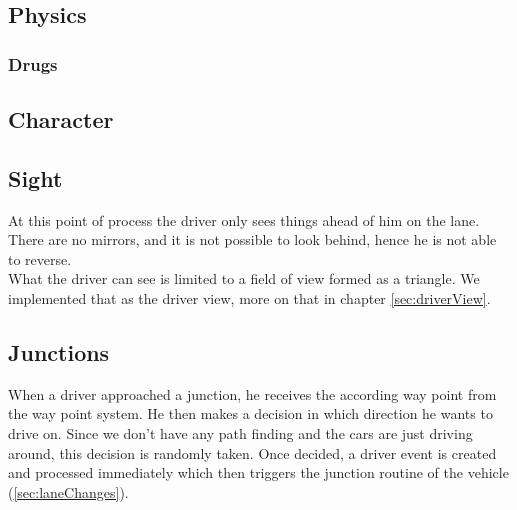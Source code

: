 \subsection{Physics}
\label{sec:physics}

\subsubsection{Drugs}
\label{sec:drugs}

\subsection{Character}
\label{sec:character}

\subsection{Sight}
\label{sec:sight}

At this point of process the driver only sees things ahead of him on the
lane. There are no mirrors, and it is not possible to look behind, hence
he is not able to reverse.\\

\noindent What the driver can see is limited to a field of view formed as 
a triangle.  We implemented that as the driver view, more on that in chapter 
\ref{sec:driverView}.

\subsection{Junctions}
\label{sec:driverJunctions}

When a driver approached a junction, he receives the according way point
from the way point system. He then makes a decision in which direction he
wants to drive on. Since we don't have any path finding and the cars are
just driving around, this decision is randomly taken. Once decided, a
driver event is created and processed immediately which then triggers
the junction routine of the vehicle (\ref{sec:laneChanges}).


